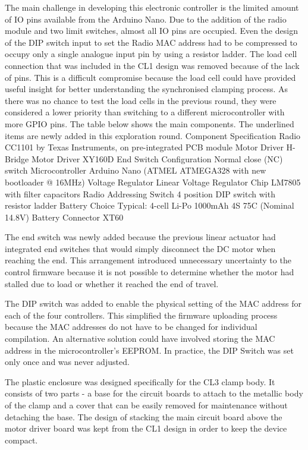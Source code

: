 The main challenge in developing this electronic controller is the limited amount of IO pins available from the Arduino Nano. Due to the addition of the radio module and two limit switches, almost all IO pins are occupied. Even the design of the DIP switch input to set the Radio MAC address had to be compressed to occupy only a single analogue input pin by using a resistor ladder. \parencite{chrisPerfectMultibuttonInput2018}
The load cell connection that was included in the CL1 design was removed because of the lack of pins. This is a difficult compromise because the load cell could have provided useful insight for better understanding the synchronised clamping process. As there was no chance to test the load cells in the previous round, they were considered a lower priority than switching to a different microcontroller with more GPIO pins.  
The table below shows the main components. The underlined items are newly added in this exploration round. 
Component
Specification
Radio
CC1101 by Texas Instruments, on pre-integrated PCB module
Motor Driver
H-Bridge Motor Driver XY160D
End Switch Configuration
Normal close (NC) switch
Microcontroller
Arduino Nano (ATMEL ATMEGA328 with new bootloader @ 16MHz)
Voltage Regulator
 Linear Voltage Regulator Chip LM7805 with filter capacitors
Radio Addressing Switch
 4 position DIP switch with resistor ladder
Battery Choice
Typical: 4-cell Li-Po 1000mAh 4S 75C (Nominal 14.8V)
Battery Connector
XT60 


The end switch was newly added because the previous linear actuator had integrated end switches that would simply disconnect the DC motor when reaching the end. This arrangement introduced unnecessary uncertainty to the control firmware because it is not possible to determine whether the motor had stalled due to load or whether it reached the end of travel.

The DIP switch was added to enable the physical setting of the MAC address for each of the four controllers. This simplified the firmware uploading process because the MAC addresses do not have to be changed for individual compilation. An alternative solution could have involved storing the MAC address in the microcontroller's EEPROM. In practice, the DIP Switch was set only once and was never adjusted. 

The plastic enclosure was designed specifically for the CL3 clamp body. It consists of two parts - a base for the circuit boards to attach to the metallic body of the clamp and a cover that can be easily removed for maintenance without detaching the base. The design of stacking the main circuit board above the motor driver board was kept from the CL1 design in order to keep the device compact. 

